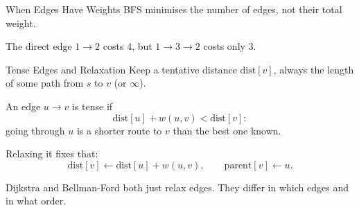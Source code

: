 \documentclass[10pt,aspectratio=169]{beamer}
\begin{document}
\begin{frame}{When Edges Have Weights}
  BFS minimises the \alert{number} of edges, not their total weight.

  \bigskip
  \begin{center}
  \end{center}

  \bigskip
  \begin{center}
    The direct edge $1 \to 2$ costs $4$, but $1 \to 3 \to 2$ costs only $3$.
  \end{center}
\end{frame}

\begin{frame}{Tense Edges and Relaxation}
  Keep a tentative distance $\text{dist}[v]$, always the length of
  \alert{some} path from $s$ to $v$ (or $\infty$).

  \bigskip
  An edge $u \to v$ is \alert{tense} if
  \[
    \text{dist}[u] + w(u, v) < \text{dist}[v]:
  \]
  going through $u$ is a shorter route to $v$ than the best one known.

  \pause
  \bigskip
  \alert{Relaxing} it fixes that:
  \[
    \text{dist}[v] \gets \text{dist}[u] + w(u, v), \qquad
    \text{parent}[v] \gets u.
  \]

  \bigskip
  \begin{center}
    Dijkstra and Bellman-Ford both just relax edges. They differ in
    \alert{which} edges and in \alert{what order}.
  \end{center}
\end{frame}
\end{document}
